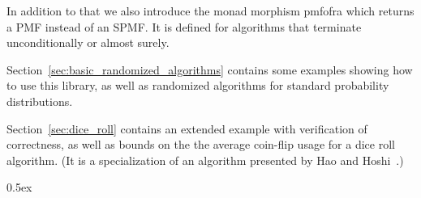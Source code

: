 \documentclass[11pt,a4paper]{article}
\begin{document}
In addition to that we also introduce the monad morphism
{pmf{\isacharunderscore}of{\isacharunderscore}ra} which returns a PMF instead of an SPMF. It is
defined for algorithms that terminate unconditionally or almost surely.

Section~\ref{sec:basic_randomized_algorithms} contains some examples showing how to use this library,
as well as randomized algorithms for standard probability distributions.

Section~\ref{sec:dice_roll} contains an extended example with verification of correctness, as well
as bounds on the the average coin-flip usage for a dice roll algorithm. (It is a
specialization of an algorithm presented by Hao and Hoshi~\cite{hao1997}.)

\parindent 0pt\parskip 0.5ex





\end{document}
